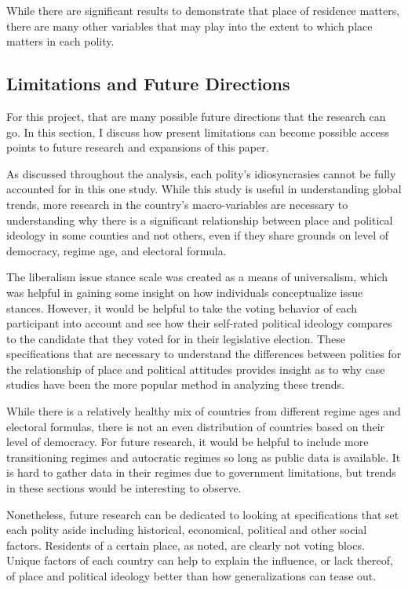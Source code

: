 \documentclass[12pt, titlepage]{article}
\begin{document}
While there are significant results to demonstrate that place of residence matters, there are many other variables that may play into the extent to which place matters in each polity.

\subsection{Limitations and Future Directions}

For this project, that are many possible future directions that the research can go. In this section, I discuss how present limitations can become possible access points to future research and expansions of this paper.

As discussed throughout the analysis, each polity's idiosyncrasies cannot be fully accounted for in this one study. While this study is useful in understanding global trends, more research in the country's macro-variables are necessary to understanding why there is a significant relationship between place and political ideology in some counties and not others, even if they share grounds on level of democracy, regime age, and electoral formula.

The liberalism issue stance scale was created as a means of universalism, which was helpful in gaining some insight on how individuals conceptualize issue stances. However, it would be helpful to take the voting behavior of each participant into account and see how their self-rated political ideology compares to the candidate that they voted for in their legislative election. These specifications that are necessary to understand the differences between polities for the relationship of place and political attitudes provides insight as to why case studies have been the more popular method in analyzing these trends. 

While there is a relatively healthy mix of countries from different regime ages and electoral formulas, there is not an even distribution of countries based on their level of democracy. For future research, it would be helpful to include more transitioning regimes and autocratic regimes so long as public data is available. It is hard to gather data in their regimes due to government limitations, but trends in these sections would be interesting to observe.

Nonetheless, future research can be dedicated to looking at specifications that set each polity aside including historical, economical, political and other social factors. Residents of a certain place, as \cite{holloway_burning_2007} noted, are clearly not voting blocs. Unique factors of each country can help to explain the influence, or lack thereof, of place and political ideology better than how generalizations can tease out.       
\end{document}
